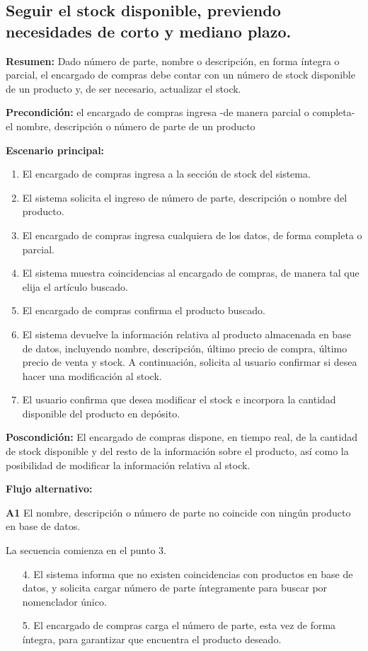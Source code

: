 \subsection{Seguir el stock disponible, previendo necesidades de corto y mediano plazo.}

\textbf{Resumen:}
Dado número de parte,
nombre o descripción,
en forma íntegra o parcial,
el encargado de compras debe contar con un número de stock disponible de un producto y,
de ser necesario,
actualizar el stock.

\textbf{Precondición:} 
el encargado de compras ingresa -de manera parcial o completa- el nombre, descripción o número de parte de un producto

\textbf{Escenario principal:}
\begin{enumerate}
	\item El encargado de compras ingresa a la sección de stock del sistema.
	\item El sistema solicita el ingreso de número de parte, descripción o nombre del producto.
	\item El encargado de compras ingresa cualquiera de los datos, de forma completa o parcial.
	\item El sistema muestra coincidencias al encargado de compras, de manera tal que elija el artículo buscado.
	\item El encargado de compras confirma el producto buscado.
	\item El sistema devuelve la información relativa al producto almacenada en base de datos,
	incluyendo nombre, descripción, último precio de compra, último precio de venta y stock.
	A continuación, solicita al usuario confirmar si desea hacer una modificación al stock.
	\item El usuario confirma que desea modificar el stock e incorpora la cantidad disponible del producto en depósito.
\end{enumerate}

\textbf{Poscondición:}
El encargado de compras dispone, en tiempo real,
de la cantidad de stock disponible
y del resto de la información sobre el producto,
así como la posibilidad de modificar la información relativa al stock.

\textbf{Flujo alternativo:}

\textbf{A1} El nombre, descripción o número de parte no coincide con ningún producto en base de datos.

La secuencia comienza en el punto 3.

\begin{enumerate}
	\item[4.] El sistema informa que no existen coincidencias con productos en base de datos,
	y solicita cargar número de parte íntegramente para buscar por nomenclador único.
	\item[5.] El encargado de compras carga el número de parte, esta vez de forma íntegra,
	para garantizar que encuentra el producto deseado.
\end{enumerate}

